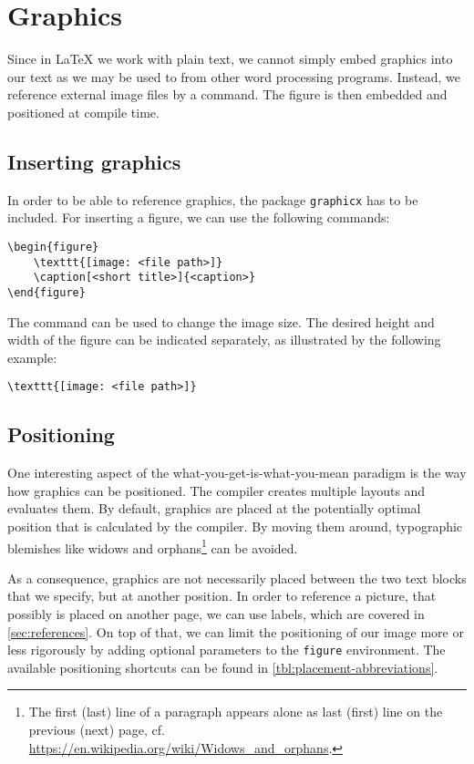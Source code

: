 \chapter{Graphics}
\label{sec:graphics}

Since in \LaTeX{} we work with plain text, we cannot simply embed graphics into our text as we may be used to from other word processing programs. 
Instead, we reference external image files by a command. The figure is then embedded and positioned at compile time.

\section{Inserting graphics}
\label{sec:display-graphics}
In order to be able to reference graphics, the package \texttt{graphicx} has to be included. For inserting a figure, we can use the following commands:
	
\begin{verbatim}
\begin{figure}
	\texttt{[image: <file path>]}
	\caption[<short title>]{<caption>}
\end{figure}
\end{verbatim}

\noindent The command  can be used to change the image size. The desired height and width of the figure can be indicated separately, as illustrated by the following example:

\begin{verbatim}
\texttt{[image: <file path>]}
\end{verbatim}

\section{Positioning}
\label{sec:graphics-placement}
One interesting aspect of the  what-you-get-is-what-you-mean paradigm is the way how graphics can be positioned. 
The compiler creates multiple layouts and evaluates them. 
By default, graphics are placed at the potentially optimal position that is calculated by the compiler.
By moving them around, typographic blemishes like widows and orphans\footnote{The first (last) line of a paragraph appears alone as last (first) line on the previous (next) page, cf. \url{https://en.wikipedia.org/wiki/Widows_and_orphans}.} can be avoided. 

As a consequence, graphics are not necessarily placed between the two text blocks that we specify, but at another position. 
In order to reference a picture, that possibly is placed on another page, we can use labels, which are covered in \cref{sec:references}. 
On top of that, we can limit the positioning of our image more or less rigorously by adding optional parameters to the \texttt{figure} environment. The available positioning shortcuts can be found in \cref{tbl:placement-abbreviations}.

